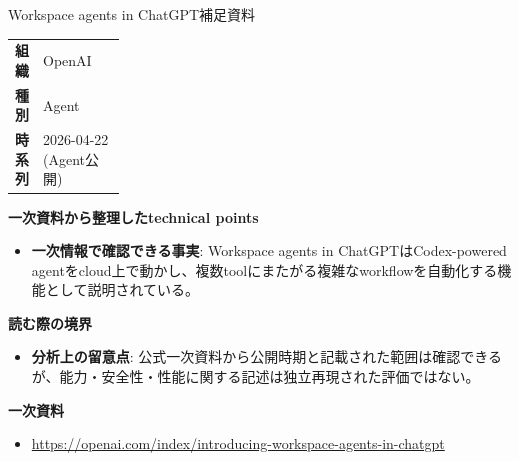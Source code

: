 \begin{technicalnote}{Workspace agents in ChatGPT}{補足資料}
\begingroup
\begin{tabularx}{\linewidth}{@{}>{\bfseries}p{0.22\linewidth}X@{}}
組織 & OpenAI \\
種別 & Agent \\
時系列 & 2026-04-22 (Agent公開) \\
\end{tabularx}
\smallskip
{\bfseries 一次資料から整理したtechnical points}
\begin{itemize}[leftmargin=1.5em,itemsep=0.35em]
\item \textbf{一次情報で確認できる事実}: Workspace agents in ChatGPTはCodex-powered agentをcloud上で動かし、複数toolにまたがる複雑なworkflowを自動化する機能として説明されている。
\end{itemize}
\begin{minipage}{\linewidth}
{\bfseries 読む際の境界}
\begin{itemize}[leftmargin=1.5em,itemsep=0.35em]
\item \textbf{分析上の留意点}: 公式一次資料から公開時期と記載された範囲は確認できるが、能力・安全性・性能に関する記述は独立再現された評価ではない。
\end{itemize}
\begin{samepage}
{\bfseries 一次資料}
\begingroup\sloppy
\begin{itemize}[leftmargin=1.5em,itemsep=0.25em]
\item {\scriptsize\url{https://openai.com/index/introducing-workspace-agents-in-chatgpt}}
\end{itemize}
\endgroup
\end{samepage}
\end{minipage}
\endgroup
\end{technicalnote}
\medskip

